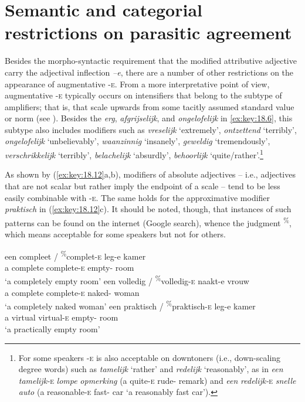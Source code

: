 \documentclass[output=paper]{langsci/langscibook}
\begin{document}
\section{Semantic and categorial restrictions on parasitic
agreement}\label{sec:key:18.3}

Besides the morpho-syntactic requirement that the modified attributive
adjective carry the adjectival inflection \emph{–e}, there are a number of
other restrictions on the appearance of augmentative \textsc{-e}. From a more
interpretative point of view, augmentative \textsc{-e} typically occurs on
intensifiers that belong to the subtype of amplifiers; that is, 
that scale upwards from some tacitly assumed standard value or norm (see
\citealt[104]{Broekhuis2013}). Besides the  \emph{erg},
\emph{afgrijselijk}, and \emph{ongelofelijk} in \eqref{ex:key:18.6}, this subtype
also includes modifiers such as \emph{vreselijk} \enquote*{extremely},
\emph{ontzettend} \enquote*{terribly}, \emph{ongelofelijk}
\enquote*{unbelievably}, \emph{waanzinnig} \enquote*{insanely}, \emph{geweldig}
\enquote*{tremendously}, \emph{verschrikkelijk} \enquote*{terribly},
\emph{belachelijk} \enquote*{absurdly}, \emph{behoor\-lijk}
\enquote*{quite/rather}.\footnote{For some speakers \textsc{-e} is also
    acceptable on downtoners (i.e., down-scaling degree words) such as
    \emph{tamelijk} \enquote*{rather} and \emph{redelijk}
    \enquote*{reasonably}, as in \emph{een} \emph{tamelijk-}\textsc{e}
    \emph{lompe} \emph{opmerking} (a quite-\textsc{e} rude-\Agr{} remark) and
\emph{een} \emph{redelijk-}\textsc{e} \emph{snelle} \emph{auto} (a
reasonable-\textsc{e} fast-\Agr{} car \enquote*{a reasonably fast car}).}

As shown by (\ref{ex:key:18.12}a,b), modifiers of absolute adjectives -- i.e.,
adjectives that are not scalar but rather imply the endpoint of a scale -- tend
to be less easily combinable with \textsc{-e}. The same holds for the
approximative modifier \emph{praktisch} in (\ref{ex:key:18.12}c). It should be
noted, though, that instances of such patterns can be found on the internet
(Google search), whence the judgment \textsuperscript{\%}, which means
acceptable for some speakers but not for others.

\ea%
    \label{ex:key:18.12}
	\ea
	\gll  een    compleet / \textsuperscript{\%}complet-\textsc{e}    leg-e            kamer\\
    a        complete {} \hphantom{\textsuperscript{\%}}complete-\textsc{e}      empty-\Agr{}  room\\
	\glt \enquote*{a completely empty room}
	\ex
	\gll een    volledig / \textsuperscript{\%}volledig-\textsc{e}        naakt-e        vrouw\\
    a        complete {} \hphantom{\textsuperscript{\%}}complete-\textsc{e} naked-\Agr{}  woman\\
    \glt \enquote*{a completely naked woman}
	\ex
	\gll  een    praktisch / \textsuperscript{\%}praktisch-\textsc{e}    leg-e            kamer\\
            a        virtual {} \hphantom{\textsuperscript{\%}}virtual-\textsc{e} empty-\Agr{}  room\\
    \glt \enquote*{a practically empty room}
	\z
\z
\end{document}
